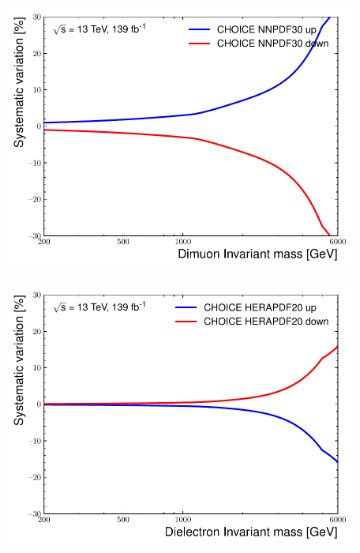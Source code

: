 \begin{figure}[h!]
\begin{subfigure}[b]{0.42\textwidth}
        \includegraphics[width=\textwidth]{figures/analysis/datamc/Uncertainties/theory/mm/backgroundTemplate_KF_CHOICE_NNPDF30.pdf}
        \label{fig:uncert:mmchoiceNNPDF}
    \end{subfigure}
    \begin{subfigure}[b]{0.42\textwidth}
        \centering
        \includegraphics[width=\textwidth]{figures/analysis/datamc/Uncertainties/theory/ee/backgroundTemplate_KF_CHOICE_HERAPDF20.pdf}
        \label{fig:uncert:eechoiceHERA}
    \end{subfigure}
    \begin{subfigure}[b]{0.42\textwidth}
        \centering

\end{subfigure}
\end{figure}
